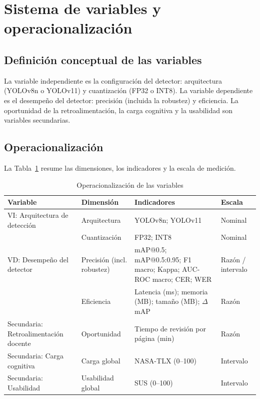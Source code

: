 \section{Sistema de variables y operacionalización}

\subsection{Definición conceptual de las variables}
La variable independiente es la configuración del detector: arquitectura
(YOLOv8n o YOLOv11) y cuantización (FP32 o INT8). La variable dependiente es el
desempeño del detector: precisión (incluida la robustez) y eficiencia. La
oportunidad de la retroalimentación, la carga cognitiva
\parencite{hart1988} y la usabilidad \parencite{brooke1996} son variables
secundarias.

\subsection{Operacionalización}
La Tabla~\ref{tab:operacionalizacion} resume las dimensiones, los indicadores y
la escala de medición.

\begin{table}[htbp]
  \centering
  \caption{Operacionalización de las variables}
  \label{tab:operacionalizacion}
  \small
  \renewcommand{\arraystretch}{1.15}
  \begin{tabularx}{\textwidth}{@{}>{\raggedright\arraybackslash}p{2.6cm}>{\raggedright\arraybackslash}p{2.6cm}>{\raggedright\arraybackslash}X>{\raggedright\arraybackslash}p{2.0cm}@{}}
    \toprule
    \textbf{Variable} & \textbf{Dimensión} & \textbf{Indicadores} & \textbf{Escala} \\
    \midrule
    VI: Arquitectura de detección & Arquitectura & YOLOv8n; YOLOv11 & Nominal \\
     & Cuantización & FP32; INT8 & Nominal \\
    \midrule
    VD: Desempeño del detector & Precisión (incl. robustez) & mAP@0.5; mAP@0.5:0.95; F1 macro; Kappa; AUC-ROC macro; CER; WER & Razón / intervalo \\
     & Eficiencia & Latencia (ms); memoria (MB); tamaño (MB); $\Delta$mAP & Razón \\
    \midrule
    Secundaria: Retroalimentación docente & Oportunidad & Tiempo de revisión por página (min) & Razón \\
    Secundaria: Carga cognitiva & Carga global & NASA-TLX (0--100) & Intervalo \\
    Secundaria: Usabilidad & Usabilidad global & SUS (0--100) & Intervalo \\
    \bottomrule
  \end{tabularx}
\end{table}
